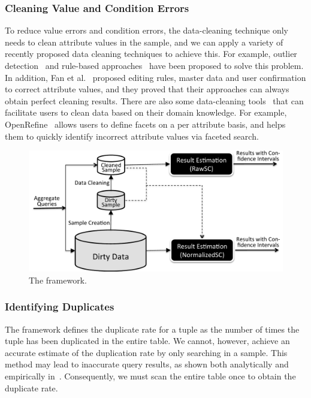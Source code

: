 \subsubsection{Cleaning Value and Condition Errors}
To reduce value errors and condition errors, the data-cleaning technique only needs to clean attribute values in the sample, and we can apply a variety of recently proposed data cleaning techniques to achieve this. 
For example, outlier detection~\cite{hellerstein2008quantitative,DBLP:conf/pervasive/JefferyAFHW06} and rule-based approaches~\cite{fan2012foundations,DBLP:conf/sigmod/DallachiesaEEEIOT13} have been proposed to solve this problem. 
In addition, Fan et al.~\cite{DBLP:journals/pvldb/FanLMTY10} proposed editing rules, master data and user confirmation to correct attribute values, and they proved that their approaches can always obtain perfect cleaning results. There are also some data-cleaning tools~\cite{openrefine,wrangler} that can facilitate users to clean data based on their domain knowledge. 
For example, OpenRefine~\cite{openrefine} allows users to define facets on a per attribute basis, and helps them to quickly identify incorrect attribute values via faceted search.  

\begin{figure}[tup]\centering \vspace{-2em}
\includegraphics[scale=0.4]{figs/newarch.pdf}
\caption{The \saqpplus framework.}\vspace{-1em}
\label{fig:arch}
\end{figure}

\subsubsection{Identifying Duplicates}\label{sec:duplication}
\iffalse
The \saqpplus framework defines the duplicate rate for a tuple as the number of times the tuple has been duplicated in the entire table. We cannot, however, achieve an accurate estimate of the duplication rate by only searching in a sample. This method may lead to inaccurate query results, as shown both analytically and empirically in~\cite{charikar2000towards}. Consequently, we must scan the entire table once to obtain the duplicate rate.







